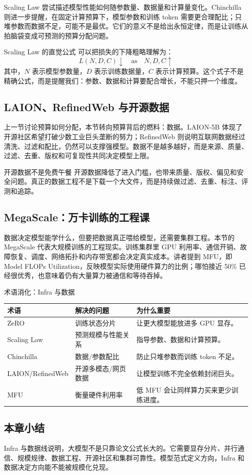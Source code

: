 Scaling Law 尝试描述模型性能如何随参数量、数据量和计算量变化。Chinchilla 则进一步提醒，在固定计算预算下，模型参数和训练 token 需要更合理配比；只堆参数而数据不足，可能不是最优。它们的意义不是给出永恒定律，而是让训练从拍脑袋变成可预测的预算分配问题。

\begin{knowledgebox}{Scaling Law 的直觉公式}
可以把损失的下降粗略理解为：
\[
L(N, D, C) \downarrow \quad \text{as} \quad N,D,C \uparrow
\]
其中，\(N\) 表示模型参数量，\(D\) 表示训练数据量，\(C\) 表示计算预算。这个式子不是精确公式，而是提醒我们：参数、数据和计算要配合增长，不能只押一个维度。
\end{knowledgebox}

\subsection{LAION、RefinedWeb 与开源数据}

上一节讨论预算如何分配，本节转向预算背后的燃料：数据。LAION-5B 体现了开源社区希望打破少数工业巨头垄断的努力；RefinedWeb 则说明互联网数据经过清洗、过滤和配比，仍然可以支撑强模型。数据不是越多越好，而是来源、质量、过滤、去重、版权和可复现性共同决定模型上限。

\begin{warningbox}{开源数据不是免费午餐}
开源数据降低了进入门槛，也带来质量、版权、偏见和安全问题。真正的数据工程不是下载一个大文件，而是持续做过滤、去重、标注、评测和追踪。
\end{warningbox}

\subsection{MegaScale：万卡训练的工程课}

数据决定模型能学什么，但要把数据真正喂给模型，还需要集群工程。本节的 MegaScale 代表大规模训练的工程现实。训练集群里 GPU 利用率、通信开销、故障恢复、调度、网络拓扑和内存带宽都会决定真实成本。讲者提到 MFU，即 Model FLOPs Utilization，反映模型实际使用硬件算力的比例；哪怕接近 50\% 已经很优秀，也意味着仍有大量算力被通信和等待吞掉。

\begin{knowledgebox}{术语消化：Infra 与数据}
\begin{tabularx}{\textwidth}{p{}p{}X}
\toprule
术语 & 解决的问题 & 为什么重要 \\
\midrule
ZeRO & 训练状态分片 & 让更大模型能放进多 GPU 显存。 \\
Scaling Law & 预测规模与性能关系 & 指导参数、数据和计算预算。 \\
Chinchilla & 数据/参数配比 & 防止只堆参数而训练 token 不足。 \\
LAION/RefinedWeb & 开源多模态/网页数据 & 让模型训练不完全依赖封闭巨头。 \\
MFU & 衡量硬件利用率 & 低 MFU 会让同样算力买来更少训练进度。 \\
\bottomrule
\end{tabularx}
\end{knowledgebox}

\subsection{本章小结}

Infra 与数据线说明，大模型不是只靠论文公式长大的。它需要显存分片、并行通信、规模规律、数据工程、开源社区和集群可靠性。模型范式定义方向，Infra 和数据决定方向能不能被规模化兑现。


